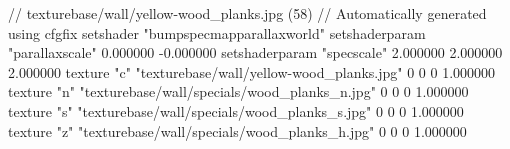 // texturebase/wall/yellow-wood_planks.jpg (58)
// Automatically generated using cfgfix
setshader "bumpspecmapparallaxworld"
setshaderparam "parallaxscale" 0.000000 -0.000000
setshaderparam "specscale" 2.000000 2.000000 2.000000
texture "c" "texturebase/wall/yellow-wood_planks.jpg" 0 0 0 1.000000
texture "n" "texturebase/wall/specials/wood_planks_n.jpg" 0 0 0 1.000000
texture "s" "texturebase/wall/specials/wood_planks_s.jpg" 0 0 0 1.000000
texture "z" "texturebase/wall/specials/wood_planks_h.jpg" 0 0 0 1.000000
